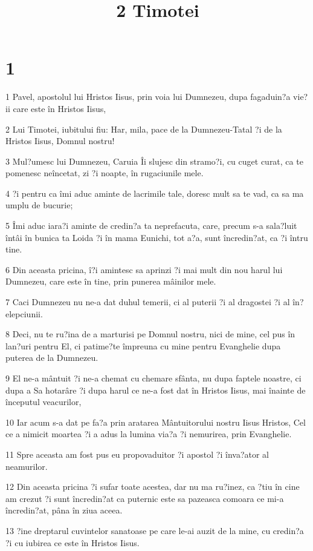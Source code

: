 

\title{2 Timotei}


\chapter{1}

\par 1 Pavel, apostolul lui Hristos Iisus, prin voia lui Dumnezeu, dupa fagaduin?a vie?ii care este în Hristos Iisus,
\par 2 Lui Timotei, iubitului fiu: Har, mila, pace de la Dumnezeu-Tatal ?i de la Hristos Iisus, Domnul nostru!
\par 3 Mul?umesc lui Dumnezeu, Caruia Îi slujesc din stramo?i, cu cuget curat, ca te pomenesc neîncetat, zi ?i noapte, în rugaciunile mele.
\par 4 ?i pentru ca îmi aduc aminte de lacrimile tale, doresc mult sa te vad, ca sa ma umplu de bucurie;
\par 5 Îmi aduc iara?i aminte de credin?a ta neprefacuta, care, precum s-a sala?luit întâi în bunica ta Loida ?i în mama Eunichi, tot a?a, sunt încredin?at, ca ?i întru tine.
\par 6 Din aceasta pricina, î?i amintesc sa aprinzi ?i mai mult din nou harul lui Dumnezeu, care este în tine, prin punerea mâinilor mele.
\par 7 Caci Dumnezeu nu ne-a dat duhul temerii, ci al puterii ?i al dragostei ?i al în?elepciunii.
\par 8 Deci, nu te ru?ina de a marturisi pe Domnul nostru, nici de mine, cel pus în lan?uri pentru El, ci patime?te împreuna cu mine pentru Evanghelie dupa puterea de la Dumnezeu.
\par 9 El ne-a mântuit ?i ne-a chemat cu chemare sfânta, nu dupa faptele noastre, ci dupa a Sa hotarâre ?i dupa harul ce ne-a fost dat în Hristos Iisus, mai înainte de începutul veacurilor,
\par 10 Iar acum s-a dat pe fa?a prin aratarea Mântuitorului nostru Iisus Hristos, Cel ce a nimicit moartea ?i a adus la lumina via?a ?i nemurirea, prin Evanghelie.
\par 11 Spre aceasta am fost pus eu propovaduitor ?i apostol ?i înva?ator al neamurilor.
\par 12 Din aceasta pricina ?i sufar toate acestea, dar nu ma ru?inez, ca ?tiu în cine am crezut ?i sunt încredin?at ca puternic este sa pazeasca comoara ce mi-a încredin?at, pâna în ziua aceea.
\par 13 ?ine dreptarul cuvintelor sanatoase pe care le-ai auzit de la mine, cu credin?a ?i cu iubirea ce este în Hristos Iisus.
